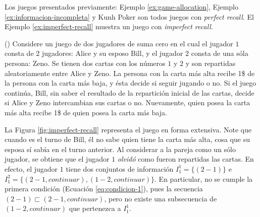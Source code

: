 Los juegos presentados previamente: Ejemplo \ref{ex:game-allocation}, Ejemplo \ref{ex:informacion-incompleta} y Kunh Poker son todos juegos con \textit{perfect recall}. El Ejemplo \ref{ex:imperfect-recall} muestra un juego con \textit{imperfect recall}.

\begin{example} (\cite{bib:conceptos-basicos})
\label{ex:imperfect-recall}
Considere un juego de dos jugadores de suma cero en el cual el jugador $1$ consta de $2$ jugadores: Alice y su esposo Bill, y el jugador $2$ consta de una sóla persona: Zeno. Se tienen dos cartas con los números $1$ y $2$ y son repartidas aleatoriamente entre Alice y Zeno. La persona con la carta más alta recibe 1\$ de la persona con la carta más baja, y ésta decide si seguir jugando o no. Si el juego continúa, Bill, sin saber el resultado de la repartición inicial de las cartas, decide si Alice y Zeno intercambian sus cartas o no. Nuevamente, quien posea la carta más alta recibe 1\$ de quien posea la carta más baja.
\end{example}

 La Figura \ref{fig:imperfect-recall} representa el juego en forma extensiva. Note que cuando es el turno de Bill, él no sabe quien tiene la carta más alta, cosa que su esposa sí sabía en el turno anterior.  Al considerar a la pareja como un sólo jugador, se obtiene que el jugador $1$ \textit{olvidó} como fueron repartidas las cartas. En efecto, el jugador $1$ tiene dos conjuntos de información $I^1_1 = \{(2-1) \}$ e $I^2_1 = \{(2-1, continuar), (1-2, continuar) \}$. En particular, no se cumple la primera condición (Ecuación \ref{eq:condicion-1}), pues la secuencia $(2-1) \sqsubset (2-1, continuar)$, pero no existe una subsecuencia de $(1-2, continuar)$ que pertenezca a $I^1_1$.

